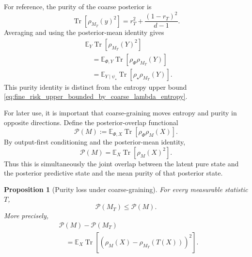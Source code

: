 \documentclass[journal]{IEEEtran}
\newtheorem{proposition}[theorem]{Proposition}
\begin{document}
For reference, the purity of the coarse posterior is
\begin{equation}
    \operatorname{Tr}[\rho_{M_T}(y)^2]
    =r_T^2+\frac{(1-r_T)^2}{d-1}.
    \label{eq:coarse_posterior_purity_as_p_lambda}
\end{equation}
Averaging and using the posterior-mean identity gives
\begin{equation}
\begin{split}
&\mathbb E_Y\operatorname{Tr}[\rho_{M_T}(Y)^2]                                  \\
&\quad=
\mathbb E_{\Phi,Y}\operatorname{Tr}[\rho_\Phi\rho_{M_T}(Y)]                   \\
&\quad=
\mathbb E_{Y\mid\psi_\star}
\operatorname{Tr}[\rho_\star\rho_{M_T}(Y)] .
\end{split}
\label{eq:coarse_mean_purity_fixed_input_fidelity_identity}
\end{equation}
This purity identity is distinct from the entropy upper bound
\eqref{eq:fine_risk_upper_bounded_by_coarse_lambda_entropy}.

For later use, it is important that coarse-graining moves entropy and purity in
opposite directions.  Define the posterior-overlap functional
\begin{equation}
    \mathcal P(M)
    :=
    \mathbb E_{\Phi,X}
    \operatorname{Tr}[\rho_\Phi\rho_M(X)].
    \label{eq:posterior_overlap_functional_definition}
\end{equation}
By output-first conditioning and the posterior-mean identity,
\begin{equation}
    \mathcal P(M)
    =
    \mathbb E_X\operatorname{Tr}[\rho_M(X)^2].
    \label{eq:posterior_overlap_equals_mean_purity}
\end{equation}
Thus this is simultaneously the joint overlap between the latent pure state
and the posterior predictive state and the mean purity of that posterior
state.

\begin{proposition}[Purity loss under coarse-graining]
\label{prop:purity_loss_under_coarse_graining}
For every measurable statistic \(T\),
\begin{equation}
    \mathcal P(M_T)\le \mathcal P(M).
    \label{eq:coarse_graining_decreases_posterior_purity}
\end{equation}
More precisely,
\begin{equation}
\begin{split}
&\mathcal P(M)-\mathcal P(M_T)\\
&\quad=
\mathbb E_X
\operatorname{Tr}\!\left[
 \left(
   \rho_M(X)-\rho_{M_T}(T(X))
 \right)^2
\right].
\end{split}
\label{eq:coarse_graining_purity_gap_hilbert_schmidt}
\end{equation}
\end{proposition}
\end{document}

